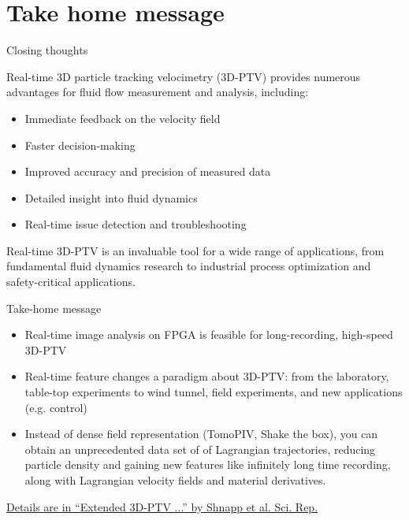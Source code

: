 \section{Take home message}\label{sec:summary}

\begin{frame}{Closing thoughts}

Real-time 3D particle tracking velocimetry (3D-PTV) provides numerous advantages for fluid flow measurement and analysis, including:

\begin{itemize}
\item Immediate feedback on the velocity field
\item Faster decision-making
\item Improved accuracy and precision of measured data
\item Detailed insight into fluid dynamics
\item Real-time issue detection and troubleshooting
\end{itemize}

Real-time 3D-PTV is an invaluable tool for a wide range of applications, from fundamental fluid dynamics research to industrial process optimization and safety-critical applications.

\end{frame}


\begin{frame}{Take-home message}
  \begin{itemize}
  \item Real-time image analysis on FPGA is feasible for long-recording, high-speed 3D-PTV
  \item Real-time feature changes a paradigm about 3D-PTV: from the laboratory, table-top experiments to wind tunnel, field experiments, and new applications (e.g. control)
  \item Instead of dense field representation (TomoPIV, Shake the box),  you can obtain an unprecedented data set of of Lagrangian trajectories, reducing particle density and gaining new features like infinitely long time recording, along with Lagrangian velocity fields and material derivatives. 
  \end{itemize}
  
  \begin{cardTiny}\href{https://www.nature.com/articles/s41598-019-43555-2}{Details are in ``Extended 3D-PTV ...'' by Shnapp et al. Sci. Rep.}
  \end{cardTiny}
  
  \end{frame}
  
